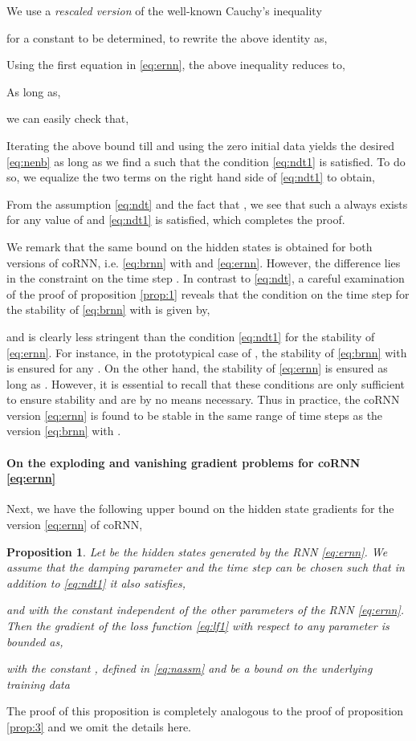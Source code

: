 \documentclass{article} \usepackage{iclr2021_conference,times}
\newtheorem{proposition}[theorem]{Proposition}
\begin{document}
We use a \emph{rescaled version} of the well-known Cauchy's inequality 

for a constant  to be determined, to rewrite the above identity as,

Using the first equation in \eqref{eq:ernn}, the above inequality reduces to,

As long as,

we can easily check that,

Iterating the above bound till  and using the zero initial data yields the desired \eqref{eq:nenb} as long as we find a  such that the condition \eqref{eq:ndt1} is satisfied. To do so, we equalize the two terms on the right hand side of \eqref{eq:ndt1} to obtain, 

From the assumption \eqref{eq:ndt} and the fact that , we see that such a  always exists for any value of  and \eqref{eq:ndt1} is satisfied, which completes the proof.

We remark that the same bound on the hidden states is obtained for both versions of coRNN, i.e. \eqref{eq:brnn} with  and \eqref{eq:ernn}. However, the difference lies in the constraint on the time step . In contrast to \eqref{eq:ndt}, a careful examination of the proof of proposition \ref{prop:1} reveals that the condition on the time step for the stability of \eqref{eq:brnn} with  is given by,

and is clearly less stringent than the condition \eqref{eq:ndt1} for the stability of \eqref{eq:ernn}. For instance, in the prototypical case of , the stability of \eqref{eq:brnn} with  is ensured for any . On the other hand, the stability of \eqref{eq:ernn} is ensured as long as . However, it is essential to recall that these conditions are only sufficient to ensure stability and are by no means necessary. Thus in practice, the coRNN version \eqref{eq:ernn} is found to be stable in the same range of time steps as the version \eqref{eq:brnn} with . 

\paragraph{On the exploding and vanishing gradient problems for coRNN \eqref{eq:ernn}}
Next, we have the following upper bound on the hidden state gradients for the version \eqref{eq:ernn} of coRNN,
\begin{proposition}
\label{prop:n3}
Let  be the hidden states generated by the RNN \eqref{eq:ernn}. We assume that the damping parameter  and the time step  can be chosen such that in addition to \eqref{eq:ndt1} it also satisfies, 

and with the constant  independent of the other parameters of the RNN \eqref{eq:ernn}. Then the gradient of the loss function  \eqref{eq:lf1} with respect to any parameter  is bounded as,

with the constant , defined in \eqref{eq:nassm} and  be a bound on the underlying training data
\end{proposition}
The proof of this proposition is completely analogous to the proof of proposition \ref{prop:3} and we omit the details here.
\end{document}
